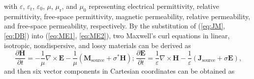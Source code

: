     with $\varepsilon$, $\varepsilon_\text{r}$, $\varepsilon_0$, $\mu$, $\mu_\text{r}$, and $\mu_0$ representing 
    electrical permittivity, relative permittivity, free-space permittivity, 
    magnetic permeability, relative permeability, and free-space permeability, respectively. 
    By the substitution of (\ref{eq:JM}, \ref{eq:DB}) into (\ref{eq:ME1}, \ref{eq:ME2}), 
    two Maxwell's curl equations in linear, isotropic, nondispersive, and lossy materials can be derived as 
    \begin{equation}
        \frac{\partial\textbf{H}}{\partial t} = -\frac{1}{\mu}\nabla\times\textbf{E} - 
            \frac{1}{\mu}\left(\textbf{M}_\text{source}+\sigma^* \textbf{H}\right)\text{;}\;
        \frac{\partial\textbf{E}}{\partial t} = \frac{1}{\varepsilon}\nabla\times\textbf{H} - 
            \frac{1}{\varepsilon}\left(\textbf{J}_\text{source}+\sigma\textbf{E}\right)\text{,}\label{eq:MEfdtdcurl2}
    \end{equation}
    and then six vector components in Cartesian coordinates can be obtained \cite{taflove-book-fdtd} as 
